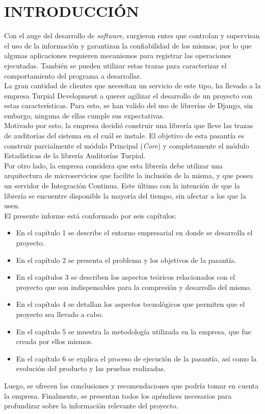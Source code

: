 \chapter*{\textbf{INTRODUCCIÓN}}

Con el auge del desarrollo de \textit{software}, surgieron entes que controlan y supervisan el uso de la información y garantizan la confiabilidad de los mismos, por lo que algunas aplicaciones requieren mecanismos para registrar las operaciones ejecutadas. También se pueden utilizar estas trazas para caracterizar el comportamiento del programa a desarrollar.\\

La gran cantidad de clientes que necesitan un servicio de este tipo, ha llevado a la empresa Turpial Development a querer agilizar el desarrollo de un proyecto con estas características. Para esto, se han valido del uso de librerías de Django, sin embargo, ninguna de ellas cumple sus expectativas.\\

Motivado por esto, la empresa decidió construir una librería que lleve las trazas de auditorías del sistema en el cuál se instale. El objetivo de esta pasantía es construir parcialmente el módulo Principal (\textit{Core}) y completamente el módulo Estadísticas de la librería Auditorías Turpial.\\

Por otro lado, la empresa considera que esta librería debe utilizar una arquitectura de microservicios que facilite la inclusión de la misma, y que posea un servidor de Integración Continua. Este último con la intención de que la librería se encuentre disponible la mayoría del tiempo, sin afectar a los que la usen.\\

El presente informe está conformado por seis capítulos:
\begin{itemize}
    \item En el capítulo 1 se describe el entorno empresarial en donde se desarrolla el proyecto.
    \item En el capítulo 2 se presenta el problema y los objetivos de la pasantía.
    \item En el capítulos 3 se describen los aspectos teóricos relacionados con el proyecto que son indispensables para la compresión y desarrollo del mismo.
    \item En el capítulo 4 se detallan los aspectos tecnológicos que permiten que el proyecto sea llevado a cabo.
    \item En el capítulo 5 se muestra la metodología utilizada en la empresa, que fue creada por ellos mismos.
    \item En el capítulo 6 se explica el proceso de ejecución de la pasantía, así como la evolución del producto y las pruebas realizadas.
\end{itemize}

Luego, se ofrecen las conclusiones y recomendaciones que podría tomar en cuenta la empresa. Finalmente, se presentan todos los apéndices necesarios para profundizar sobre la información relevante del proyecto.
